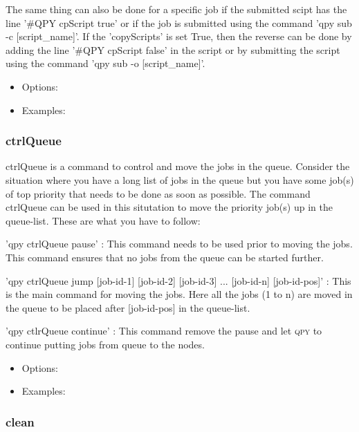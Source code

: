 \documentclass[a4paper,12pt]{article}
\newcommand{\qpy}{\textsc{qpy}}
\begin{document}
The same thing can also be done for a specific job if the submitted scipt has the line '\#QPY cpScript true' or if the job is submitted using the command 'qpy sub -c [script\_name]'.
If the 'copyScripts' is set True, then the reverse can be done by adding the line '\#QPY cpScript false' in the script or by submitting the script using the command 'qpy sub -o [script\_name]'.


\begin{itemize}

\item Options: %

  
\item Examples:

\end{itemize}

\subsubsection{ctrlQueue}

ctrlQueue is a command to control and move the jobs in the queue.
Consider the situation where you  have a long list of jobs in the queue but you have some job(s) of top priority that needs to be done as soon as possible.
The command ctrlQueue can be used in this situtation to move the priority job(s) up in the queue-list.
These are what you have to follow:

'qpy ctrlQueue pause' : This command needs to be used prior to moving the jobs. This command ensures that no jobs from the queue can be started further. 

'qpy ctrlQueue jump [job-id-1] [job-id-2] [job-id-3] ... [job-id-n] [job-id-pos]' : This is the main command for moving the jobs. Here all the jobs (1 to n) are moved in the queue to be placed after [job-id-pos] in the queue-list. 

'qpy ctlrQueue continue' : This command remove the pause and let \qpy{} to continue putting jobs from queue to the nodes. 

\begin{itemize}

\item Options:

\item Examples:

\end{itemize}

\subsubsection{clean}
\end{document}
